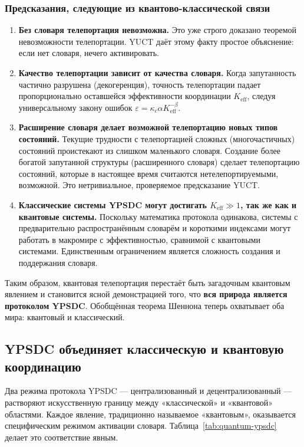 \documentclass[12pt,a4paper]{article}
\theoremstyle{remark}
\begin{document}
	\subsubsection*{Предсказания, следующие из квантово-классической связи}
	
	\begin{enumerate}
		\item \textbf{Без словаря телепортация невозможна.} Это уже строго доказано теоремой невозможности телепортации. YUCT даёт этому факту простое объяснение: если нет словаря, нечего активировать.
		\item \textbf{Качество телепортации зависит от качества словаря.} Когда запутанность частично разрушена (декогеренция), точность телепортации падает пропорционально оставшейся эффективности координации \( K_{\mathrm{eff}} \), следуя универсальному закону ошибок \( \varepsilon = \kappa_c \alpha K_{\mathrm{eff}}^{-\beta} \).
		\item \textbf{Расширение словаря делает возможной телепортацию новых типов состояний.} Текущие трудности с телепортацией сложных (многочастичных) состояний проистекают из слишком маленького словаря. Создание более богатой запутанной структуры (расширенного словаря) сделает телепортацию состояний, которые в настоящее время считаются нетелепортируемыми, возможной. Это нетривиальное, проверяемое предсказание YUCT.
		\item \textbf{Классические системы YPSDC могут достигать \( K_{\mathrm{eff}} \gg 1 \), так же как и квантовые системы.} Поскольку математика протокола одинакова, системы с предварительно распространённым словарём и короткими индексами могут работать в макромире с эффективностью, сравнимой с квантовыми системами. Единственным ограничением является сложность создания и поддержания словаря.
	\end{enumerate}
	
	Таким образом, квантовая телепортация перестаёт быть загадочным квантовым явлением и становится ясной демонстрацией того, что \textbf{вся природа является протоколом YPSDC}. Обобщённая теорема Шеннона теперь охватывает оба мира: квантовый и классический.
	
	\subsection{YPSDC объединяет классическую и квантовую координацию}
	\label{subsec:unified-table}
	
	Два режима протокола YPSDC — централизованный и децентрализованный — растворяют искусственную границу между «классической» и «квантовой» областями. Каждое явление, традиционно называемое «квантовым», оказывается специфическим режимом активации словаря. Таблица~\ref{tab:quantum-ypsdc} делает это соответствие явным.
	
\end{document}
